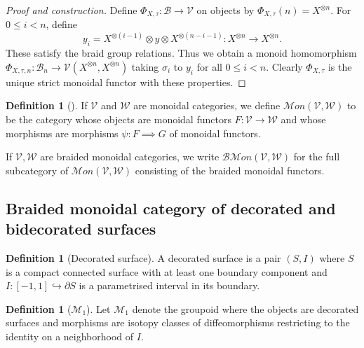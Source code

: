 \documentclass[reqno]{amsart}
\theoremstyle{definition}
\newtheorem{definition}[theorem]{Definition}
\theoremstyle{remark}
\newcommand{\Mon}{{\mathcal{M}}on}
\newcommand{\BMon}{{\mathcal{B}\mathcal{M}}on}
\begin{document}
     \begin{proof}[Proof and construction]
         Define $\Phi_{X, \tau} \colon \mathcal{B} \to \mathcal{V}$ 
         on objects by $\Phi_{X,\tau} (n) = 
         X^{\otimes n}$. For
         $0 \le i < n$, define 
         \[
         y_i = X^{\otimes (i-1)} \otimes y 
         \otimes X^{\otimes (n-i-1)} \colon X^{\otimes n} \to 
         X^{\otimes n}.
         \] 
         These satisfy the braid group relations.
         Thus we obtain a monoid homomorphism
         $\Phi_{X, \tau, n} \colon \mathcal{B}_n \to 
         \mathcal{V} \left( X^{\otimes n}, X^{\otimes n} \right) $ 
         taking $\sigma_i$ to $y_i$ for all
         $0 \le i <n$. Clearly $\Phi_{X, \tau}$ is the unique
         strict monoidal functor with these properties.
     \end{proof}

     \begin{definition}[]
         If $\mathcal{V}$ and $\mathcal{W}$ are monoidal categories,
         we define $\Mon \left( 
         \mathcal{V}, \mathcal{W}\right) $ to be the
         category whose objects are
         monoidal functors $F \colon \mathcal{V} \to 
         \mathcal{W}$ and whose morphisms are
         morphisms $\psi \colon F \implies G$ of
         monoidal functors.

         If $\mathcal{V}, \mathcal{W}$ are braided monoidal
         categories, we write
         $\BMon \left( \mathcal{V}, \mathcal{W} \right) $ for
         the full subcategory of
         $\Mon \left( \mathcal{V}, \mathcal{W} \right) $ consisting
         of the braided monoidal functors.
     \end{definition}




   \subsection{Braided monoidal category of decorated and
   bidecorated surfaces}

   \begin{definition}[Decorated surface]
       A decorated surface is a pair
       $(S,I)$ where $S$ is a compact connected
       surface with at least one boundary component
       and $I \colon \left[ -1,1 \right] 
       \hookrightarrow \partial S$ is a parametrised interval
       in its boundary.
   \end{definition}

   \begin{definition}[$\mathcal{M}_1$]
       Let $\mathcal{M}_1$ denote the groupoid where
       the objects are
       decorated surfaces and
       morphisms are isotopy classes of diffeomorphisms
       restricting to the identity on a neighborhood
       of $I$.
   \end{definition}
\end{document}
